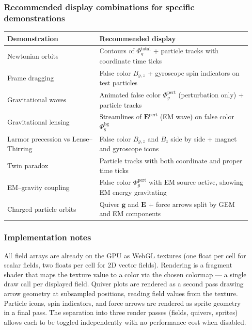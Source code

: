 \documentclass[11pt,a4paper]{article}
\newcommand{\vv}[1]{\mathbf{#1}}
\newcommand{\Phig}{\Phi_g}
\begin{document}
\subsubsection*{Recommended display combinations for specific demonstrations}

\begin{center}
\begin{tabular}{@{}L{4cm}L{8cm}@{}}
\toprule
\textbf{Demonstration} & \textbf{Recommended display} \\
\midrule
Newtonian orbits & Contours of $\Phig^{\mathrm{total}}$ + particle tracks with coordinate time ticks \\
Frame dragging & False color $B_{g,z}$ + gyroscope spin indicators on test particles \\
Gravitational waves & Animated false color $\Phig^{\mathrm{pert}}$ (perturbation only) + particle tracks \\
Gravitational lensing & Streamlines of $\vv{E}^{\mathrm{pert}}$ (EM wave) on false color $\Phig^{\mathrm{bg}}$ \\
Larmor precession vs Lense--Thirring & False color $B_{g,z}$ and $B_z$ side by side + magnet and gyroscope icons \\
Twin paradox & Particle tracks with both coordinate and proper time ticks \\
EM--gravity coupling & False color $\Phig^{\mathrm{pert}}$ with EM source active, showing EM energy gravitating \\
Charged particle orbits & Quiver $\vv{g}$ and $\vv{E}$ + force arrows split by GEM and EM components \\
\bottomrule
\end{tabular}
\end{center}

\subsubsection*{Implementation notes}

All field arrays are already on the GPU as WebGL textures (one float per cell for scalar fields, two floats per cell for 2D vector fields).  Rendering is a fragment shader that maps the texture value to a color via the chosen colormap --- a single draw call per displayed field.  Quiver plots are rendered as a second pass drawing arrow geometry at subsampled positions, reading field values from the texture.  Particle icons, spin indicators, and force arrows are rendered as sprite geometry in a final pass.  The separation into three render passes (fields, quivers, sprites) allows each to be toggled independently with no performance cost when disabled.
\end{document}
